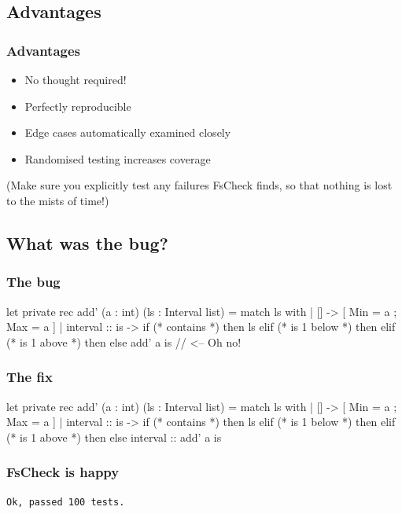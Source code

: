 \documentclass{beamer}
\begin{document}
\subsection{Advantages}

\begin{frame}
\frametitle{Advantages}

\begin{itemize}
\item No thought required!
\item Perfectly reproducible
\item Edge cases automatically examined closely
\item Randomised testing increases coverage
\end{itemize}

\hfill \break

(Make sure you explicitly test any failures FsCheck finds, so that nothing is lost to the mists of time!)
\end{frame}

\subsection{What was the bug?}
\begin{frame}[fragile]
\frametitle{The bug}
\begin{fslisting}
let private rec add' (a : int) (ls : Interval list) =
    match ls with
    | [] -> [{ Min = a ; Max = a }]
    | interval :: is ->
        if (* contains *) then
            ls
        elif (* is 1 below *) then
        elif (* is 1 above *) then
        else
            add' a is // <-- Oh no!
\end{fslisting}
\end{frame}

\begin{frame}[fragile]
\frametitle{The fix}
\begin{fslisting}
let private rec add' (a : int) (ls : Interval list) =
    match ls with
    | [] -> [{ Min = a ; Max = a }]
    | interval :: is ->
        if (* contains *) then
            ls
        elif (* is 1 below *) then
        elif (* is 1 above *) then
        else
            interval :: add' a is
\end{fslisting}
\end{frame}

\begin{frame}[fragile]
\frametitle{FsCheck is happy}
\begin{verbatim}
Ok, passed 100 tests.
\end{verbatim}
\end{frame}
\end{document}
